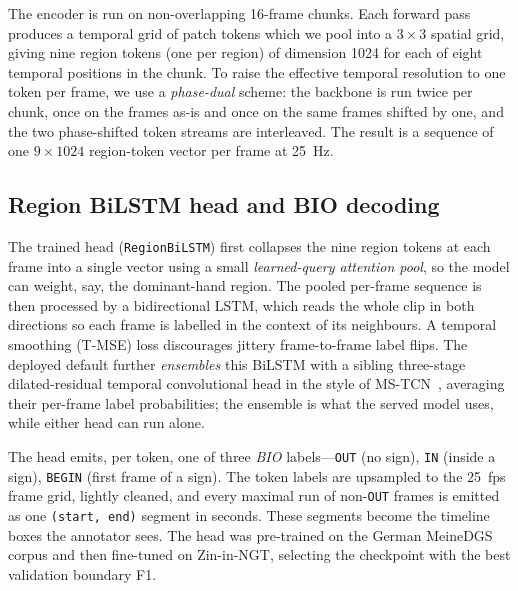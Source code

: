 \documentclass[11pt]{article}
\newcommand{\code}[1]{\texttt{\small #1}}
\begin{document}
The encoder is run on non-overlapping 16-frame chunks. Each forward pass produces a temporal
grid of patch tokens which we pool into a $3\times3$ spatial grid, giving nine region tokens
(one per region) of dimension 1024 for each of eight temporal positions in the chunk. To raise
the effective temporal resolution to one token per frame, we use a \emph{phase-dual} scheme: the
backbone is run twice per chunk, once on the frames as-is and once on the same frames shifted by
one, and the two phase-shifted token streams are interleaved. The result is a sequence of one
$9\times1024$ region-token vector per frame at 25~Hz.

\subsection{Region BiLSTM head and BIO decoding}
The trained head (\code{RegionBiLSTM}) first collapses the nine region tokens at each frame into
a single vector using a small \emph{learned-query attention pool}, so the model can weight, say,
the dominant-hand region. The pooled per-frame sequence is then processed by a bidirectional
LSTM, which reads the whole clip in both directions so each frame is labelled in the context of
its neighbours. A temporal smoothing (T-MSE) loss discourages jittery frame-to-frame label
flips. The deployed default further \emph{ensembles} this BiLSTM with a sibling three-stage
dilated-residual temporal convolutional head in the style of MS-TCN~\cite{mstcn}, averaging
their per-frame label probabilities; the ensemble is what the served model uses, while either
head can run alone.

The head emits, per token, one of three \emph{BIO} labels---\code{OUT} (no sign), \code{IN}
(inside a sign), \code{BEGIN} (first frame of a sign). The token labels are upsampled to the
25~fps frame grid, lightly cleaned, and every maximal run of non-\code{OUT} frames is emitted as
one \code{(start, end)} segment in seconds. These segments become the timeline boxes the
annotator sees. The head was pre-trained on the German MeineDGS corpus and then fine-tuned on
Zin-in-NGT, selecting the checkpoint with the best validation boundary F1.
\end{document}
